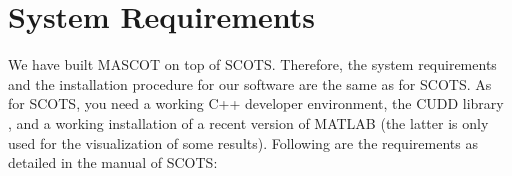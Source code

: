 \documentclass[a4paper]{article}
\newcommand{\mascot}{\textsf{MASCOT}\xspace}
\newcommand{\scots}{\textsf{SCOTS}\xspace}
\begin{document}
	\section{System Requirements}
		We have built \mascot on top of \scots \cite{Scots}. Therefore, the system requirements and the installation procedure for our software are the same as for \scots. As for \scots, you need a working C++ developer environment, the CUDD library \cite{somenzi2009cudd}, and a working installation of a recent version of MATLAB (the latter is only used for the visualization of some results). Following are the requirements as detailed in the manual of \scots:
\end{document}
